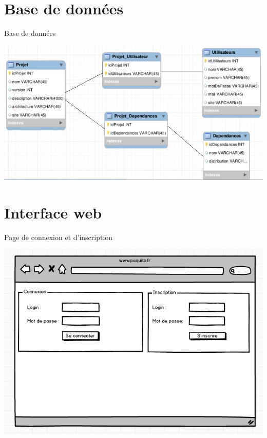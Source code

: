 \documentclass[9pt,xcolor=dvipsnames]{beamer}
\begin{document}
\renewcommand\largeur{0.485}

\section{Base de données}
\begin{frame}{Base de données}
  \begin{center}
    \includegraphics[scale=0.65]{../img/bdd.jpg}
  \end{center}
\end{frame}

\section{Interface web}
\begin{frame}{Page de connexion et d'inscription}
  \begin{center}
    \includegraphics[scale=\largeur]{../img/connexionPaquito.png}
  \end{center}
\end{frame}
\end{document}
